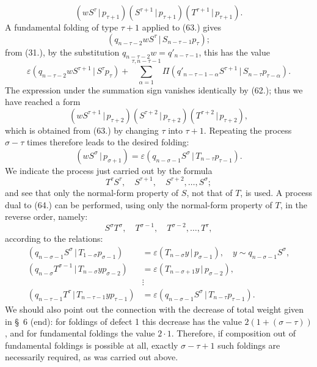 \documentclass[11pt]{article}
\providecommand{\pair}[2]{(#1\,|\,#2)}
\providecommand{\eps}{\varepsilon}
\begin{document}
\begin{equation}
 \pair{wS^\tau}{p_{\tau+1}}\pair{S^{\tau+1}}{p_{\tau+1}}\pair{T^{\tau+1}}{p_{\tau+1}}.
\tag{63}
\end{equation}
A fundamental folding of type $\tau+1$ applied to (63.) gives
\[
 \pair{q_{n-\tau-2}wS^\tau}{S_{n-\tau-1}p_\tau};
\]
from (31.), by the substitution $q_{n-\tau-2}w=q'_{n-\tau-1}$, this has the value
\[
 \eps\pair{q_{n-\tau-2}wS^{\tau+1}}{S^\tau p_\tau}
 +\sum_{\alpha=1}^{\tau,n-\tau-1}\Pi\pair{q'_{n-\tau-1-\alpha}S^{\tau+1}}{S_{n-\tau}p_{\tau-\alpha}}.
\]
The expression under the summation sign vanishes identically by (62.); thus we have reached a form
\[
 \pair{wS^{\tau+1}}{p_{\tau+2}}\pair{S^{\tau+2}}{p_{\tau+2}}\pair{T^{\tau+2}}{p_{\tau+2}},
\]
which is obtained from (63.) by changing $\tau$ into $\tau+1$. Repeating the process $\sigma-\tau$ times therefore leads to the desired folding:
\[
 \pair{wS^\sigma}{p_{\sigma+1}}=\eps\pair{q_{n-\sigma-1}S^\sigma}{T_{n-\tau}p_{\tau-1}}.
\]
We indicate the process just carried out by the formula
\begin{equation}
 T^\tau S^\tau,
\quad S^{\tau+1},\quad S^{\tau+2},\ldots,S^\sigma;
\tag{64}
\end{equation}
and see that only the normal-form property of $S$, not that of $T$, is used. A process dual to (64.) can be performed, using only the normal-form property of $T$, in the reverse order, namely:
\begin{equation}
 S^\sigma T^\sigma,
\quad T^{\sigma-1},\quad T^{\sigma-2},\ldots,T^\tau,
\tag{65}
\end{equation}
according to the relations:
\begin{align*}
\pair{q_{n-\sigma-1}S^\sigma}{T_{1-\sigma}p_{\sigma-1}}&=\eps\pair{T_{n-\sigma}y}{p_{\sigma-1}},\quad y\sim q_{n-\sigma-1}S^\sigma,\\
\pair{q_{n-\sigma}T^{\sigma-1}}{T_{n-\sigma}yp_{\sigma-2}}&=\eps\pair{T_{n-\sigma+1}y}{p_{\sigma-2}},\\
&\vdots\\
\pair{q_{n-\tau-1}T^\tau}{T_{n-\tau-1}yp_{\tau-1}}&=\eps\pair{q_{n-\sigma-1}S^\sigma}{T_{n-\tau}p_{\tau-1}}.
\end{align*}
We should also point out the connection with the decrease of total weight given in \S\ 6 (end): for foldings of defect 1 this decrease has the value $2(1+(\sigma-\tau))$, and for fundamental foldings the value $2\cdot1$. Therefore, if composition out of fundamental foldings is possible at all, exactly $\sigma-\tau+1$ such foldings are necessarily required, as was carried out above.
\end{document}
